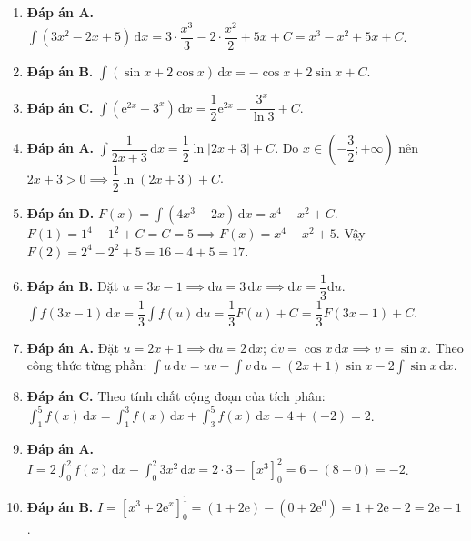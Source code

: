 \documentclass[12pt,a4paper]{article}
\begin{document}
\begin{enumerate}[start=16]
\item \textbf{Đáp án A.}  
$\int (3x^2 - 2x + 5)\,\mathrm{d}x = 3 \cdot \dfrac{x^3}{3} - 2 \cdot \dfrac{x^2}{2} + 5x + C = x^3 - x^2 + 5x + C$.

\item \textbf{Đáp án B.}  
$\int (\sin x + 2\cos x)\,\mathrm{d}x = -\cos x + 2\sin x + C$.

\item \textbf{Đáp án C.}  
$\int (\mathrm{e}^{2x} - 3^x)\,\mathrm{d}x = \dfrac{1}{2}\mathrm{e}^{2x} - \dfrac{3^x}{\ln 3} + C$.

\item \textbf{Đáp án A.}  
$\int \dfrac{1}{2x+3}\,\mathrm{d}x = \dfrac{1}{2}\ln|2x+3| + C$. Do $x \in \left(-\dfrac{3}{2}; +\infty\right)$ nên $2x+3 > 0 \implies \dfrac{1}{2}\ln(2x+3) + C$.

\item \textbf{Đáp án D.}  
$F(x) = \int (4x^3 - 2x)\,\mathrm{d}x = x^4 - x^2 + C$.  
$F(1) = 1^4 - 1^2 + C = C = 5 \implies F(x) = x^4 - x^2 + 5$.  
Vậy $F(2) = 2^4 - 2^2 + 5 = 16 - 4 + 5 = 17$.

\item \textbf{Đáp án B.}  
Đặt $u = 3x - 1 \implies \mathrm{d}u = 3\,\mathrm{d}x \implies \mathrm{d}x = \dfrac{1}{3}\mathrm{d}u$.  
$\int f(3x-1)\,\mathrm{d}x = \dfrac{1}{3}\int f(u)\,\mathrm{d}u = \dfrac{1}{3}F(u) + C = \dfrac{1}{3}F(3x-1) + C$.

\item \textbf{Đáp án A.}  
Đặt $u = 2x+1 \implies \mathrm{d}u = 2\,\mathrm{d}x$; $\mathrm{d}v = \cos x\,\mathrm{d}x \implies v = \sin x$.  
Theo công thức từng phần: $\int u\,\mathrm{d}v = uv - \int v\,\mathrm{d}u = (2x+1)\sin x - 2\int \sin x\,\mathrm{d}x$.

\item \textbf{Đáp án C.}  
Theo tính chất cộng đoạn của tích phân:  
$\int_1^5 f(x)\,\mathrm{d}x = \int_1^3 f(x)\,\mathrm{d}x + \int_3^5 f(x)\,\mathrm{d}x = 4 + (-2) = 2$.

\item \textbf{Đáp án A.}  
$I = 2\int_0^2 f(x)\,\mathrm{d}x - \int_0^2 3x^2\,\mathrm{d}x = 2 \cdot 3 - \left[ x^3 \right]_0^2 = 6 - (8 - 0) = -2$.

\item \textbf{Đáp án B.}  
$I = \left[ x^3 + 2\mathrm{e}^x \right]_0^1 = (1 + 2\mathrm{e}) - (0 + 2\mathrm{e}^0) = 1 + 2\mathrm{e} - 2 = 2\mathrm{e} - 1$.


\end{enumerate}
\end{document}
